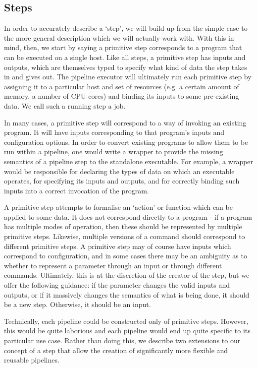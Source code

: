 \documentclass[10pt,a4paper]{article}
\newcommand{\npar}{\par\noindent\space}
\begin{document}
\subsection{Steps}
\npar In order to accurately describe a `step', we will build up from the simple case to the more general description which we will actually work with. With this in mind, then, we start by saying a \gls{primitive step} corresponds to a program that can be executed on a single host. Like all steps, a primitive step has inputs and outputs, which are themselves typed to specify what kind of data the step takes in and gives out. The pipeline executor will ultimately run each primitive step by assigning it to a particular host and set of resources (e.g. a certain amount of memory, a number of CPU cores) and binding its inputs to some pre-existing data. We call such a running step a \gls{job}.
\npar In many cases, a \gls{primitive step} will correspond to a way of invoking an existing program. It will have inputs corresponding to that program's inputs and configuration options. In order to convert existing programs to allow them to be run within a pipeline, one would write a wrapper to provide the missing semantics of a pipeline step to the standalone executable. For example, a wrapper would be responsible for declaring the types of data on which an executable operates, for specifying its inputs and outputs, and for correctly binding such inputs into a correct invocation of the program.
\npar A primitive step attempts to formalise an `action' or function which can be applied to some data. It does not correspond directly to a program - if a program has multiple modes of operation, then these should be represented by multiple primitive steps. Likewise, multiple versions of a command should correspond to different primitive steps. A primitive step may of course have inputs which correspond to configuration, and in some cases there may be an ambiguity as to whether to represent a parameter through an input or through different commands. Ultimately, this is at the discretion of the creator of the step, but we offer the following guidance: if the parameter changes the valid inputs and outputs, or if it massively changes the semantics of what is being done, it should be a new step. Otherwise, it should be an input.
\npar Technically, each pipeline could be constructed only of primitive steps. However, this would be quite laborious and each pipeline would end up quite specific to its particular use case. Rather than doing this, we describe two extensions to our concept of a step that allow the creation of significantly more flexible and reusable pipelines.
\end{document}
